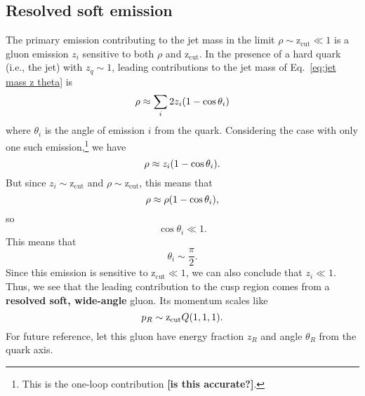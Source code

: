 \documentclass[12pt,twoside,class=../reedthesis, crop=false]{standalone}
\newcommand{\zcut}{\mathrm{z_{cut}}}
\begin{document}
\subsection{Resolved soft emission}
	The primary emission contributing to the jet mass in the limit $\rho \sim \zcut \ll 1$ is a gluon emission $z_i$ sensitive to both $\rho$ and $\zcut$. In the presence of a hard quark (i.e., the jet) with $z_q \sim 1$, leading contributions to the jet mass of Eq.~\ref{eq:jet mass z theta} is
	\begin{equation}
		\rho \approx \sum_i 2z_i \qty(1 - \cos\theta_i)
	\end{equation}
	where $\theta_i$ is the angle of emission $i$ from the quark. Considering the case with only one such emission,\footnote{This is the one-loop contribution {\color{red}\textbf{[is this accurate?]}}.} we have
	\begin{equation}
		\rho \approx z_i \qty(1 - \cos\theta_i).
	\end{equation} 
	But since $z_i \sim \zcut$ and $\rho \sim \zcut$, this means that
	\begin{equation}
		\rho \approx \rho \qty(1 - \cos\theta_i),
	\end{equation}
	so
	\begin{equation}
		\cos\theta_i \ll 1.
	\end{equation}
	This means that
	\begin{equation}
		\theta_i \sim \frac{\pi}{2}.
	\end{equation}
	Since this emission is sensitive to $\zcut \ll 1$, we can also conclude that $z_i \ll 1$. Thus, we see that the leading contribution to the cusp region comes from a \textbf{resolved soft, wide-angle} gluon. Its momentum scales like
	\begin{equation}
		p_R \sim \zcut Q \qty(1, 1, 1).
	\end{equation}
	For future reference, let this gluon have energy fraction $z_R$ and angle $\theta_R$ from the quark axis.
\end{document}
